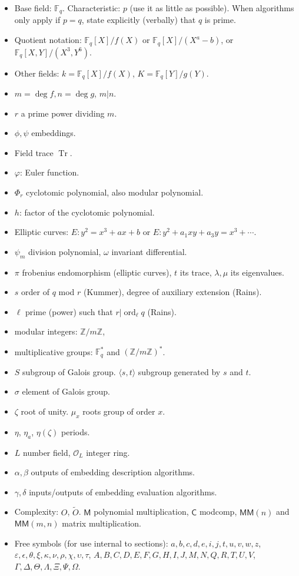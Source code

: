 \documentclass[12pt]{article}
\theoremstyle{plain}
\theoremstyle{definition}
\newcommand{\tildO}{\tilde{O}}
\DeclareMathOperator{\trace}{Tr} %
\DeclareMathOperator{\order}{ord} %
\def\Z{\ensuremath{\mathbb{Z}}}
\def\F{\ensuremath{\mathbb{F}}}
\def\MM{\ensuremath{\mathsf{M}}}
\def\MMM{\ensuremath{\mathsf{MM}}}
\def\CC{\ensuremath{\mathsf{C}}}
\def\euler{\ensuremath{\varphi}}
\newcounter{algorithm}
\begin{document}
\begin{itemize}
\item Base field: $\F_q$. Characteristic: $p$ (use it as little as
  possible). When algorithms only apply if $p=q$, state explicitly
  (verbally) that $q$ is prime.
\item Quotient notation: $\F_q[X]/f(X)$ or $\F_q[X]/(X^a-b)$, or
  $\F_q[X,Y]/(X^3,Y^6)$.
\item Other fields: $k = \F_q[X]/f(X)$, $K = \F_q[Y]/g(Y)$.
\item $m = \deg f, n=\deg g$, $m|n$.
\item $r$ a prime power dividing $m$.
\item $\phi,\psi$ embeddings.
\item Field trace $\trace$.
\item $\euler$: Euler function.
\item $\Phi_r$ cyclotomic polynomial, also modular polynomial.
\item $h$: factor of the cyclotomic polynomial.
\item Elliptic curves: $E:y^2=x^3+ax+b$ or $E:y^2+a_1xy+a_3y=x^3+\cdots$.
\item $\psi_m$ division polynomial, $\omega$ invariant differential.
\item $\pi$ frobenius endomorphism (elliptic curves), $t$ its trace,
  $\lambda,\mu$ its eigenvalues.
\item $s$ order of $q$ mod $r$ (Kummer), degree of auxiliary extension (Rains).
\item $\ell$ prime (power) such that $r|\order_\ell q$ (Rains).
\item modular integers: $\Z/m\Z$,
\item multiplicative groups: $\F_q^\ast$ and $(\Z/m\Z)^\ast$.
\item $S$ subgroup of Galois group. $\langle s,t \rangle$ subgroup
  generated by $s$ and $t$.
\item $\sigma$ element of Galois group.
\item $\zeta$ root of unity. $\mu_x$ roots group of order $x$.
\item $\eta$, $\eta_a$, $\eta(\zeta)$ periods.
\item $L$ number field, $\mathcal{O}_L$ integer ring.
\item $\alpha,\beta$ outputs of embedding description algorithms.
\item $\gamma,\delta$ inputs/outputs of embedding evaluation algorithms.
\item Complexity: $O$, $\tildO$. $\MM$ polynomial multiplication,
  $\CC$ modcomp, $\MMM(n)$ and $\MMM(m,n)$ matrix multiplication.
\item Free symbols (for use internal to sections):
  $a,b,c,d,e,i,j,t,u,v,w,z$,
  $\varepsilon,\epsilon,\theta,\xi,\kappa,\nu,\rho,\chi,\upsilon,\tau$,
  $A,B,C,D,E,F,G,H,I,J,M,N,Q,R,T,U,V$,
  $\Gamma,\Delta,\Theta,\Lambda,\Xi,\Psi,\Omega$.
\end{itemize}
\end{document}
